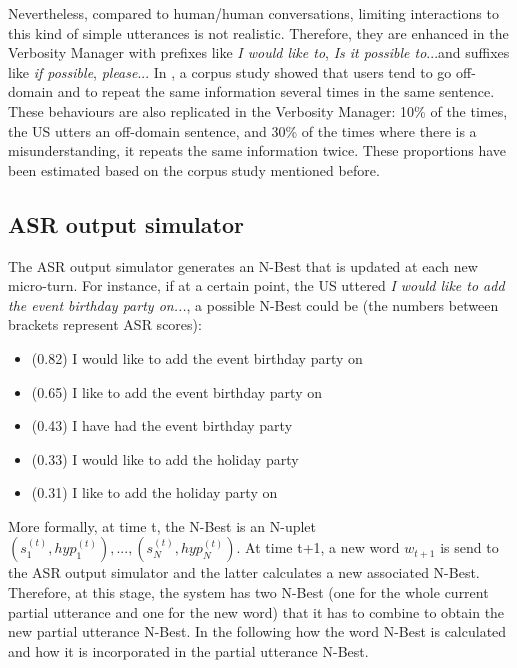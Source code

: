 			Nevertheless, compared to human/human conversations, limiting interactions to this kind of simple utterances is not realistic. Therefore, they are enhanced in the Verbosity Manager with prefixes like \textit{I would like to}, \textit{Is it possible to}...and suffixes like \textit{if possible}, \textit{please}... In \cite{Ghigi2014}, a corpus study showed that users tend to go off-domain and to repeat the same information several times in the same sentence. These behaviours are also replicated in the Verbosity Manager: 10\% of the times, the US utters an off-domain sentence, and 30\% of the times where there is a misunderstanding, it repeats the same information twice. These proportions have been estimated based on the corpus study mentioned before.
		
    \subsection{ASR output simulator}
    \label{subsec:asroutputsimu}
    
     	The ASR output simulator generates an N-Best that is updated at each new micro-turn. For instance, if at a certain point, the US uttered \textit{I would like to add the event birthday party on...}, a possible N-Best could be (the numbers between brackets represent ASR scores):
        
        \begin{itemize}
					\item (0.82) I would like to add the event birthday party on
					\item (0.65) I like to add the event birthday party on
					\item (0.43) I have had the event birthday party
					\item (0.33) I would like to add the holiday party
					\item (0.31) I like to add the holiday party on
        \end{itemize}
        
       	More formally, at time t, the N-Best is an N-uplet ${(s_1^{(t)},hyp_1^{(t)}),...,(s_N^{(t)},hyp_N^{(t)})}$. At time t+1, a new word $w_{t+1}$ is send to the ASR output simulator and the latter calculates a new associated N-Best. Therefore, at this stage, the system has two N-Best (one for the whole current partial utterance and one for the new word) that it has to combine to obtain the new partial utterance N-Best. In the following how the word N-Best is calculated and how it is incorporated in the partial utterance N-Best.
        
